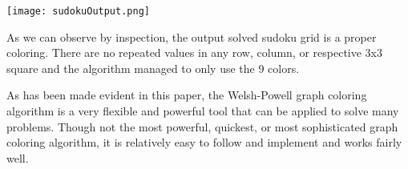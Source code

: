 \documentclass[12pt, letterpaper]{article}
\begin{document}
\begin{center}
\texttt{[image: sudokuOutput.png]}
\end{center}


As we can observe by inspection, the output solved sudoku grid is a proper coloring. There are no repeated values in any row, column, or respective 3x3 square and the algorithm managed to only use the 9 colors.


\begin{figure}[h!]%
\begin{center}
	\qquad
{}%
\end{center}
\end{figure}


As has been made evident in this paper, the Welsh-Powell graph coloring algorithm is a very flexible and powerful tool that can be applied to solve many problems. Though not the most powerful, quickest, or most sophisticated graph coloring algorithm, it is relatively easy to follow and implement and works fairly well.
\end{document}
